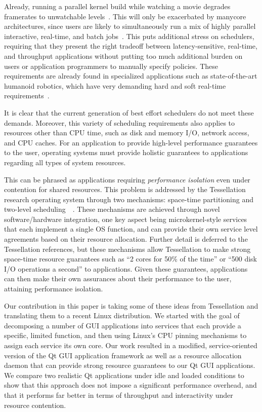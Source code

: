 \documentclass[letterpaper,twocolumn,11pt]{article}
\begin{document}
Already, running a parallel kernel build while watching a movie degrades framerates to unwatchable levels~\cite{DBLP:conf/osdi/YangLBKM08}. This will only be exacerbated by manycore architectures, since users are likely to simultaneously run a mix of highly parallel interactive, real-time, and batch jobs~\cite{liu09tessellation}. This puts additional stress on schedulers, requiring that they present the right tradeoff between latency-sensitive, real-time, and throughput applications without putting too much additional burden on users or application programmers to manually specify policies. These requirements are already found in specialized applications such as state-of-the-art humanoid robotics, which have very demanding hard and soft real-time requirements~\cite{Yoo:2009:RPD:1618617.1618723, Kaneko04humanoidrobot}. 

It is clear that the current generation of best effort schedulers do not meet these demands. Moreover, this variety of scheduling requirements also applies to resources other than CPU time, such as disk and memory I/O, network access, and CPU caches. For an application to provide high-level performance guarantees to the user, operating systems must provide holistic guarantees to applications regarding all types of system resources.

This can be phrased as applications requiring \textit{performance isolation} even under contention for shared resources. This problem is addressed by the Tessellation research operating system through two mechanisms: space-time partitioning and two-level scheduling~\cite{liu09tessellation}~\cite{tessellation-hotpar10}. These mechanisms are achieved through novel software/hardware integration, one key aspect being microkernel-style services that each implement a single OS function, and can provide their own service level agreements based on their resource allocation. Further detail is deferred to the Tessellation references, but these mechanisms allow Tessellation to make strong space-time resource guarantees such as ``2 cores for 50\% of the time'' or ``500 disk I/O operations a second'' to applications. Given these guarantees, applications can then make their own assurances about their performance to the user, attaining performance isolation.

Our contribution in this paper is taking some of these ideas from Tessellation and translating them to a recent Linux distribution. We started with the goal of decomposing a number of GUI applications into services that each provide a specific, limited function, and then using Linux's CPU pinning mechanisms to assign each service its own core. Our work resulted in a modified, service-oriented version of the Qt GUI application framework as well as a resource allocation daemon that can provide strong resource guarantees to our Qt GUI applications. We compare two realistic Qt applications under idle and loaded conditions to show that this approach does not impose a significant performance overhead, and that it performs far better in terms of throughput and interactivity under resource contention.
\end{document}
